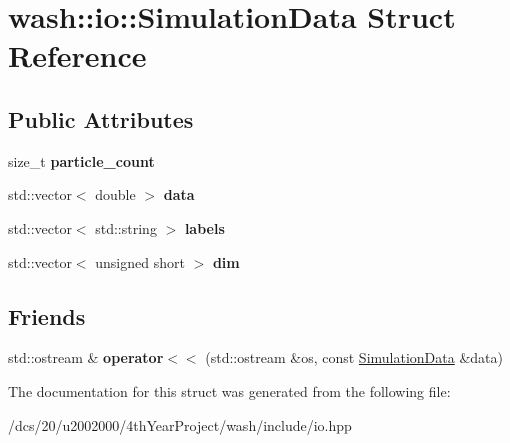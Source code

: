 \hypertarget{structwash_1_1io_1_1SimulationData}{}\section{wash\+:\+:io\+:\+:Simulation\+Data Struct Reference}
\label{structwash_1_1io_1_1SimulationData}
\subsection*{Public Attributes}
\begin{DoxyCompactItemize}
\item 
\mbox{\label{structwash_1_1io_1_1SimulationData_a21236f5ec63d5f10fedc79860baac63a}} 
size\+\_\+t {\bfseries particle\+\_\+count}
\item 
\mbox{\label{structwash_1_1io_1_1SimulationData_a6129996b88985d21217e8054e69cdf40}} 
std\+::vector$<$ double $>$ {\bfseries data}
\item 
\mbox{\label{structwash_1_1io_1_1SimulationData_af41f6f3caf54e0c7eee01b81c29f5617}} 
std\+::vector$<$ std\+::string $>$ {\bfseries labels}
\item 
\mbox{\label{structwash_1_1io_1_1SimulationData_a874b6512db1cf9a349da7a1b202f8dfe}} 
std\+::vector$<$ unsigned short $>$ {\bfseries dim}
\end{DoxyCompactItemize}
\subsection*{Friends}
\begin{DoxyCompactItemize}
\item 
\mbox{\label{structwash_1_1io_1_1SimulationData_ada32e2aed3a804ad52036cfe5ffe0540}} 
std\+::ostream \& {\bfseries operator$<$$<$} (std\+::ostream \&os, const \mbox{\hyperlink{structwash_1_1io_1_1SimulationData}{Simulation\+Data}} \&data)
\end{DoxyCompactItemize}


The documentation for this struct was generated from the following file\+:\begin{DoxyCompactItemize}
\item 
/dcs/20/u2002000/4th\+Year\+Project/wash/include/io.\+hpp\end{DoxyCompactItemize}
